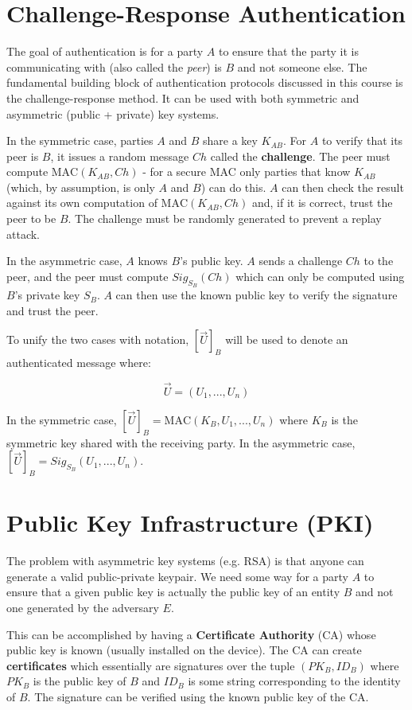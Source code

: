 \documentclass[11pt]{report}
\begin{document}
\section{Challenge-Response Authentication}
The goal of authentication is for a party $A$ to ensure that the party it is communicating with (also called the \textit{peer}) is $B$ and not someone else. The fundamental building block of authentication protocols discussed in this course is the challenge-response method. It can be used with both symmetric and asymmetric (public + private) key systems.

In the symmetric case, parties $A$ and $B$ share a key $K_{AB}$. For $A$ to verify that its peer is $B$, it issues a random message $Ch$ called the \textbf{challenge}. The peer must compute $\text{MAC}(K_{AB},Ch)$ - for a secure MAC only parties that know $K_{AB}$ (which, by assumption, is only $A$ and $B$) can do this. $A$ can then check the result against its own computation of $\text{MAC}(K_{AB},Ch)$ and, if it is correct, trust the peer to be $B$. The challenge must be randomly generated to prevent a replay attack.

In the asymmetric case, $A$ knows $B$'s public key. $A$ sends a challenge $Ch$ to the peer, and the peer must compute $Sig_{S_B}(Ch)$ which can only be computed using $B$'s private key $S_B$. $A$ can then use the known public key to verify the signature and trust the peer.

To unify the two cases with notation, $[\vec{U}]_B$ will be used to denote an authenticated message where:

$$\vec{U} = (U_1, ..., U_n)$$

In the symmetric case, $[\vec{U}]_B = \text{MAC}(K_B, U_1, ..., U_n)$ where $K_B$ is the symmetric key shared with the receiving party. In the asymmetric case, $[\vec{U}]_B = Sig_{S_B}(U_1, ..., U_n)$.

\section{Public Key Infrastructure (PKI)}
The problem with asymmetric key systems (e.g. RSA) is that anyone can generate a valid public-private keypair. We need some way for a party $A$ to ensure that a given public key is actually the public key of an entity $B$ and not one generated by the adversary $E$.

This can be accomplished by having a \textbf{Certificate Authority} (CA) whose public key is known (usually installed on the device). The CA can create \textbf{certificates} which essentially are signatures over the tuple $(PK_{B}, ID_{B})$ where $PK_B$ is the public key of $B$ and $ID_B$ is some string corresponding to the identity of $B$. The signature can be verified using the known public key of the CA.
\end{document}
